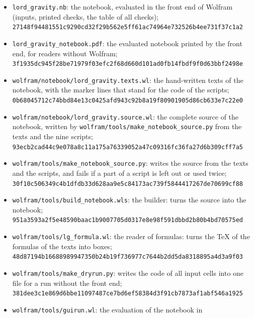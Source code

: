\documentclass[
  10pt,
]{article}
\providecommand{\tightlist}{%
  \setlength{\itemsep}{0pt}\setlength{\parskip}{0pt}}
\begin{document}
\begin{itemize}
\tightlist
\item
  \texttt{lord\_gravity.nb}: the notebook, evaluated in the front end of
  Wolfram (inputs, printed checks, the table of all checks);\\
  \texttt{27148f94481551c9290cd32f29b562e5ff61ac74964e732526b4ee731f37c1a2}
\item
  \texttt{lord\_gravity\_notebook.pdf}: the evaluated notebook printed
  by the front end, for readers without Wolfram;\\
  \texttt{3f1935dc945f28be71979f03efc2f68d660d101ad0fb14fbdf9f0d63bbf2498e}
\item
  \texttt{wolfram/notebook/lord\_gravity.texts.wl}: the hand-written
  texts of the notebook, with the marker lines that stand for the code
  of the scripts;\\
  \texttt{0b68045712c74bbd84e13c0425afd943c92b8a19f80901905d86cb633e7c22e0}
\item
  \texttt{wolfram/notebook/lord\_gravity.source.wl}: the complete source
  of the notebook, written by
  \texttt{wolfram/tools/make\_notebook\_source.py} from the texts and
  the nine scripts;\\
  \texttt{93ecb2cad44c9e078a8c11a175a76339052a47c09316fc36fa27d6b309cff7a5}
\item
  \texttt{wolfram/tools/make\_notebook\_source.py}: writes the source
  from the texts and the scripts, and fails if a part of a script is
  left out or used twice;\\
  \texttt{30f10c506349c4b1dfdb33d628aa9e5c84173ac739f5844417267de70699cf88}
\item
  \texttt{wolfram/tools/build\_notebook.wls}: the builder: turns the
  source into the notebook;\\
  \texttt{951a3593a2f5e48590baac1b9007705d0317e8e98f591dbbd2b80b4bd70575ed}
\item
  \texttt{wolfram/tools/lg\_formula.wl}: the reader of formulas: turns
  the TeX of the formulas of the texts into boxes;\\
  \texttt{48d87194b16688989947350b24b19f736977c7644b2dd5da8318895a4d3a9f03}
\item
  \texttt{wolfram/tools/make\_dryrun.py}: writes the code of all input
  cells into one file for a run without the front end;\\
  \texttt{381dee3c1e869d6bbe11097487ce7bd6ef58384d3f91cb7873af1abf546a1925}
\item
  \texttt{wolfram/tools/guirun.wl}: the evaluation of the notebook in

\end{itemize}
\end{document}
